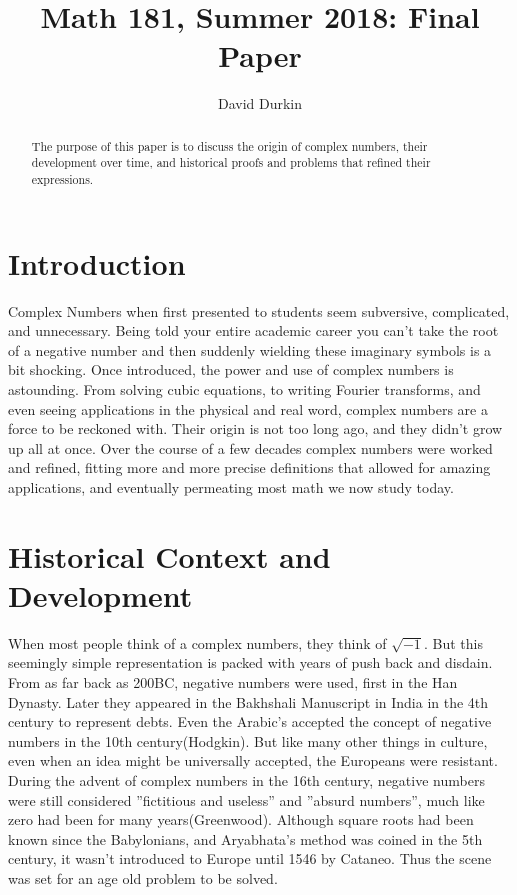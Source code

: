 \documentclass[12pt]{article}
\begin{document}
\title{Math 181, Summer 2018: Final Paper}

\author{David Durkin}

\maketitle

\begin{abstract}
The purpose of this paper is to discuss the origin of complex numbers, their development over time, and historical proofs and problems that refined their expressions.
\end{abstract}

\section{Introduction}

\hspace{\parindent} Complex Numbers when first presented to students seem subversive, complicated, and unnecessary. Being told your entire academic career you can't take the root of a negative number and then suddenly wielding these imaginary symbols is a bit shocking. Once introduced, the power and use of complex numbers is astounding. From solving cubic equations, to writing Fourier transforms, and even seeing applications in the physical and real word, complex numbers are a force to be reckoned with. Their origin is not too long ago, and they didn't grow up all at once. Over the course of a few decades complex numbers were worked and refined, fitting more and more precise definitions that allowed for amazing applications, and eventually permeating most math we now study today. 


\section{Historical Context and Development}

\hspace{\parindent} When most people think of a complex numbers, they think of $\sqrt{-1}$. But this seemingly simple representation is packed with years of push back and disdain. From as far back as 200BC, negative numbers were used, first in the Han Dynasty. Later they appeared in the Bakhshali Manuscript in India in the 4th century to represent debts. Even the Arabic's accepted the concept of negative numbers in the 10th century(Hodgkin). But like many other things in culture, even when an idea might be universally accepted, the Europeans were resistant. During the advent of complex numbers in the 16th century, negative numbers were still considered ''fictitious and useless'' and ''absurd numbers'', much like zero had been for many years(Greenwood). Although square roots had been known since the Babylonians, and Aryabhata's method was coined in the 5th century, it wasn't introduced to Europe until 1546 by Cataneo. Thus the scene was set for an age old problem to be solved. 
\end{document}
